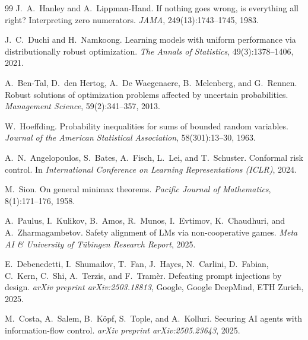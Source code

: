 \begin{thebibliography}{99}
J.~A.~Hanley and A.~Lippman-Hand.
\newblock If nothing goes wrong, is everything all right? Interpreting zero numerators.
\newblock \emph{JAMA}, 249(13):1743--1745, 1983.

J.~C.~Duchi and H.~Namkoong.
\newblock Learning models with uniform performance via distributionally robust optimization.
\newblock \emph{The Annals of Statistics}, 49(3):1378--1406, 2021.

A.~Ben-Tal, D.~den Hertog, A.~De Waegenaere, B.~Melenberg, and G.~Rennen.
\newblock Robust solutions of optimization problems affected by uncertain probabilities.
\newblock \emph{Management Science}, 59(2):341--357, 2013.

W.~Hoeffding.
\newblock Probability inequalities for sums of bounded random variables.
\newblock \emph{Journal of the American Statistical Association}, 58(301):13--30, 1963.

A.~N.~Angelopoulos, S.~Bates, A.~Fisch, L.~Lei, and T.~Schuster.
\newblock Conformal risk control.
\newblock In \emph{International Conference on Learning Representations (ICLR)}, 2024.


M.~Sion.
\newblock On general minimax theorems.
\newblock \emph{Pacific Journal of Mathematics}, 8(1):171--176, 1958.

A.~Paulus, I.~Kulikov, B.~Amos, R.~Munos, I.~Evtimov, K.~Chaudhuri, and A.~Zharmagambetov.
\newblock Safety alignment of LMs via non-cooperative games.
\newblock \emph{Meta AI \& University of Tübingen Research Report}, 2025.


E.~Debenedetti, I.~Shumailov, T.~Fan, J.~Hayes, N.~Carlini, D.~Fabian, C.~Kern, C.~Shi, A.~Terzis, and F.~Tram{\`e}r.
\newblock Defeating prompt injections by design.
\newblock \emph{arXiv preprint arXiv:2503.18813}, Google, Google DeepMind, ETH Zurich, 2025.

M.~Costa, A.~Salem, B.~K{\"o}pf, S.~Tople, and A.~Kolluri.
\newblock Securing AI agents with information-flow control.
\newblock \emph{arXiv preprint arXiv:2505.23643}, 2025.


\end{thebibliography}
